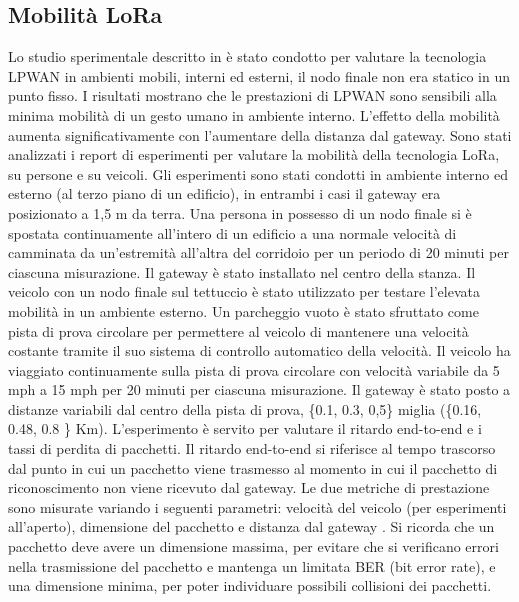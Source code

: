 \documentclass[a4paper]{report} %
\begin{document}
\subsection{Mobilità LoRa}
Lo studio sperimentale descritto in \cite{art:rif.47} è stato condotto per valutare la tecnologia LPWAN in ambienti mobili, interni ed esterni, il nodo finale non era statico in un punto fisso. I risultati mostrano che le prestazioni di LPWAN sono sensibili alla minima mobilità di un gesto umano in ambiente interno. L'effetto della mobilità aumenta significativamente con l'aumentare della distanza dal gateway. %
Sono stati analizzati i report di esperimenti per valutare la mobilità della tecnologia LoRa, su persone e su veicoli. Gli esperimenti sono stati condotti in ambiente interno ed esterno (al terzo piano di un edificio), in entrambi i casi il gateway era posizionato a 1,5 m da terra. Una persona in possesso di un nodo finale si è spostata continuamente all'intero di un edificio a una normale velocità di camminata da un'estremità all'altra del corridoio per un periodo di 20 minuti per ciascuna misurazione. Il gateway è stato installato nel centro della stanza. Il veicolo con un nodo finale sul tettuccio è stato utilizzato per testare l'elevata mobilità in un ambiente esterno. Un parcheggio vuoto è stato sfruttato come pista di prova circolare per permettere al veicolo di mantenere una velocità costante tramite il suo sistema di controllo automatico della velocità. Il veicolo ha viaggiato continuamente sulla pista di prova circolare con velocità variabile da 5 mph a 15 mph per 20 minuti per ciascuna misurazione. Il gateway è stato posto a distanze variabili dal centro della pista di prova, \{0.1, 0.3, 0,5\} miglia (\{0.16, 0.48, 0.8 \} Km). 
L'esperimento è servito per valutare il ritardo end-to-end e i tassi di perdita di pacchetti. Il ritardo end-to-end si riferisce al tempo trascorso dal punto in cui un pacchetto viene trasmesso al momento in cui il pacchetto di riconoscimento non viene ricevuto dal gateway. Le due metriche di prestazione sono misurate variando i seguenti parametri: velocità del veicolo (per esperimenti all'aperto), dimensione del pacchetto e distanza dal gateway \cite{art:rif.47}. 
Si ricorda che un pacchetto deve avere un dimensione massima, per evitare che si verificano errori nella trasmissione del pacchetto e mantenga un limitata BER (bit error rate), e una dimensione minima, per poter individuare possibili collisioni dei pacchetti.
\end{document}
